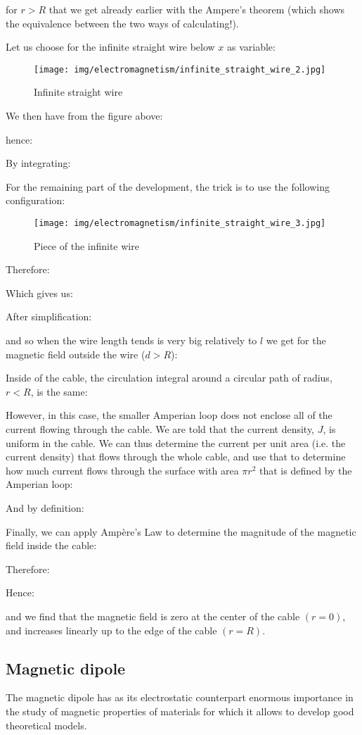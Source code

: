	for $r>R$ that we get already earlier with the Ampere's theorem (which shows the equivalence between the two ways of calculating!).
	
	Let us choose for the infinite straight wire below $x$ as variable:
	\begin{figure}[H]
		\centering
		\texttt{[image: img/electromagnetism/infinite\_straight\_wire\_2.jpg]}
		\caption{Infinite straight wire}
	\end{figure}
	We then have from the figure above:
	
	hence:
	
	By integrating:
	
	For the remaining part of the development, the trick is to use the following configuration:
	\begin{figure}[H]
		\centering
		\texttt{[image: img/electromagnetism/infinite\_straight\_wire\_3.jpg]}
		\caption{Piece of the infinite wire}
	\end{figure}
	Therefore:
	
	Which gives us:
	
	After simplification:
	
	and so when the wire length tends is very big relatively to $l$ we get for the magnetic field outside the wire ($d>R$):
	
	Inside of the cable, the circulation integral around a circular path of radius, $r<R$, is the same:
	
	However, in this case, the smaller Amperian loop does not enclose all of the current flowing through the cable. We are told that the current density, $J$, is uniform in the cable. We can thus determine the current per unit area (i.e. the current density) that flows through the whole cable, and use that to determine how much current flows through the surface with area $\pi r^{2}$ that is defined by the Amperian loop:
	
	And by definition:
	
	Finally, we can apply Ampère's Law to determine the magnitude of the magnetic field inside the cable:
	
	Therefore:
	
	Hence:
	
	and we find that the magnetic field is zero at the center of the cable $(r=0)$, and increases linearly up to the edge of the cable $(r=R)$.
	
	\pagebreak
	\subsection{Magnetic dipole}
	The magnetic dipole has as its electrostatic counterpart enormous importance in the study of magnetic properties of materials for which it allows to develop good theoretical models.
	
